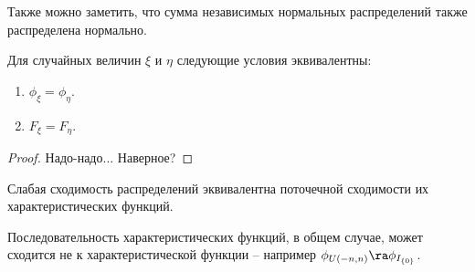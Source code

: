 \begin{note}
    Также можно заметить, что сумма независимых нормальных распределений также распределена нормально.
\end{note}
\begin{theorem}[О единственности]
    Для случайных величин $\xi$ и $\eta$ следующие условия эквивалентны:
    \begin{enumerate}
        \item $\phi_\xi = \phi_\eta$.
        \item $F_{\xi} = F_{\eta}$.
    \end{enumerate}
\end{theorem}
\begin{proof}
    Надо-надо... Наверное?
\end{proof}
\begin{note}
    Слабая сходимость распределений эквивалентна поточечной сходимости их характеристических функций.
\end{note}
\begin{note}
    Последовательность характеристических функций, в общем случае, может сходится не к характеристической функции -- например $\phi_{U(-n, n)} \ra \phi_{I_{\{0\}}}$.
\end{note}
